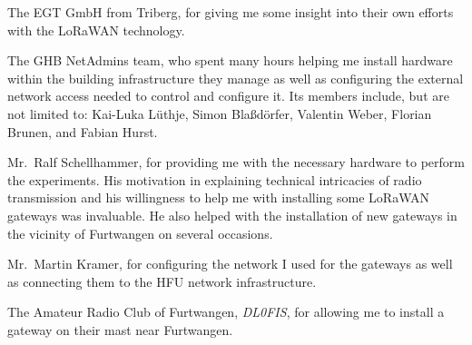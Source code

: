 The EGT GmbH from Triberg, for giving me some insight into their own efforts with the \ac{LoRaWAN} technology.

The \ac{GHB} NetAdmins team, who spent many hours helping me install hardware within the building infrastructure they manage as well as configuring the external network access needed to control and configure it.
Its members include, but are not limited to: Kai-Luka Lüthje, Simon Blaßdörfer, Valentin Weber, Florian Brunen, and Fabian Hurst.

Mr.\ Ralf Schellhammer, for providing me with the necessary hardware to perform the experiments.
His motivation in explaining technical intricacies of radio transmission and his willingness to help me with installing some \ac{LoRaWAN} gateways was invaluable.
He also helped with the installation of new gateways in the vicinity of Furtwangen on several occasions.

Mr.\ Martin Kramer, for configuring the network I used for the gateways as well as connecting them to the \ac{HFU} network infrastructure.

The Amateur Radio Club of Furtwangen, \emph{DL0FIS}, for allowing me to install a gateway on their mast near Furtwangen.

